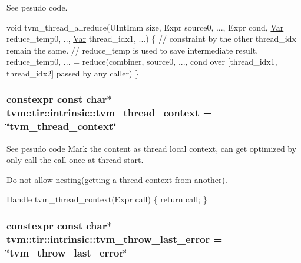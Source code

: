 See pesudo code. 

void tvm\+\_\+thread\+\_\+allreduce(U\+Int\+Imm size, Expr source0, ..., Expr cond, \hyperlink{classtvm_1_1tir_1_1Var}{Var} reduce\+\_\+temp0, .., \hyperlink{classtvm_1_1tir_1_1Var}{Var} thread\+\_\+idx1, ...) \{ // constraint by the other thread\+\_\+idx remain the same. // reduce\+\_\+temp is used to save intermediate result. reduce\+\_\+temp0, ... = reduce(combiner, source0, ..., cond over \mbox{[}thread\+\_\+idx1, thread\+\_\+idx2\mbox{]} passed by any caller) \} 
\subsubsection[{\texorpdfstring{tvm\+\_\+thread\+\_\+context}{tvm_thread_context}}]{\setlength{\rightskip}{0pt plus 5cm}constexpr const char$\ast$ tvm\+::tir\+::intrinsic\+::tvm\+\_\+thread\+\_\+context = \char`\"{}tvm\+\_\+thread\+\_\+context\char`\"{}}\hypertarget{namespacetvm_1_1tir_1_1intrinsic_a3480cec5a6cf03c2cc894d6f889d1f39}{}\label{namespacetvm_1_1tir_1_1intrinsic_a3480cec5a6cf03c2cc894d6f889d1f39}


See pesudo code Mark the content as thread local context, can get optimized by only call the call once at thread start. 

Do not allow nesting(getting a thread context from another).

Handle tvm\+\_\+thread\+\_\+context(\+Expr call) \{ return call; \} 
\subsubsection[{\texorpdfstring{tvm\+\_\+throw\+\_\+last\+\_\+error}{tvm_throw_last_error}}]{\setlength{\rightskip}{0pt plus 5cm}constexpr const char$\ast$ tvm\+::tir\+::intrinsic\+::tvm\+\_\+throw\+\_\+last\+\_\+error = \char`\"{}tvm\+\_\+throw\+\_\+last\+\_\+error\char`\"{}}\hypertarget{namespacetvm_1_1tir_1_1intrinsic_ad86e388d33768f6641d60a2e1d142cbb}{}\label{namespacetvm_1_1tir_1_1intrinsic_ad86e388d33768f6641d60a2e1d142cbb}


